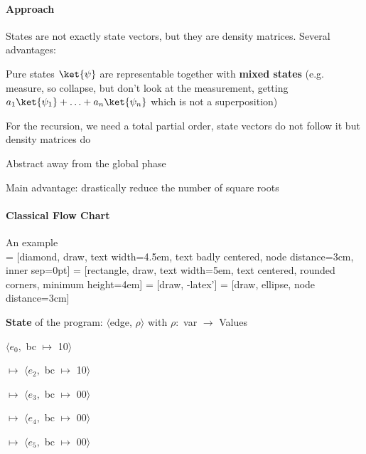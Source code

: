\documentclass[10pt]{report}
\begin{document}
\paragraph{Approach} States are not exactly state vectors, but they are density matrices. Several advantages: \begin{list}{}{}
	\item Pure states $\ket{\psi}$ are representable together with \textbf{mixed states} (e.g. measure, so collapse, but don't look at the measurement, getting $a_1\ket{\psi_1}+\ldots+a_n\ket{\psi_n}$ which is not a superposition)
	\item For the recursion, we need a total partial order, state vectors do not follow it but density matrices do
	\item Abstract away from the global phase
	\item Main advantage: drastically reduce the number of square roots
\end{list} 
\pagebreak
\paragraph{Classical Flow Chart} An example\\
 = [diamond, draw, 
    text width=4.5em, text badly centered, node distance=3cm, inner sep=0pt]
 = [rectangle, draw, 
    text width=5em, text centered, rounded corners, minimum height=4em]
 = [draw, -latex']
 = [draw, ellipse, node distance=3cm]
\begin{multicols}{2}
\textbf{State} of the program: $\langle$edge, $\rho\rangle$ with $\rho:$ var $\rightarrow$ Values
\begin{list}{}{}
	\item $\langle e_0,$ bc $\mapsto$ 10$\rangle$
	\item[$\mapsto$] $\langle e_2,$ bc $\mapsto$ 10$\rangle$
	\item[$\mapsto$] $\langle e_3,$ bc $\mapsto$ 00$\rangle$
	\item[$\mapsto$] $\langle e_4,$ bc $\mapsto$ 00$\rangle$
	\item[$\mapsto$] $\langle e_5,$ bc $\mapsto$ 00$\rangle$
\end{list}
\columnbreak
\begin{center}
\end{center}
\end{multicols}
\end{document}
